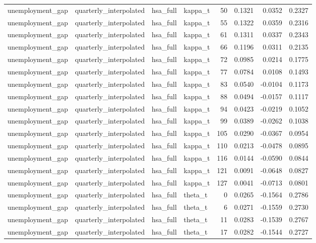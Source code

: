 \begin{tabular}{llllrrrr}
unemployment\_gap & quarterly\_interpolated & hsa\_full & kappa\_t & 50 & 0.1321 & 0.0352 & 0.2327 \\
unemployment\_gap & quarterly\_interpolated & hsa\_full & kappa\_t & 55 & 0.1322 & 0.0359 & 0.2316 \\
unemployment\_gap & quarterly\_interpolated & hsa\_full & kappa\_t & 61 & 0.1311 & 0.0337 & 0.2343 \\
unemployment\_gap & quarterly\_interpolated & hsa\_full & kappa\_t & 66 & 0.1196 & 0.0311 & 0.2135 \\
unemployment\_gap & quarterly\_interpolated & hsa\_full & kappa\_t & 72 & 0.0985 & 0.0214 & 0.1775 \\
unemployment\_gap & quarterly\_interpolated & hsa\_full & kappa\_t & 77 & 0.0784 & 0.0108 & 0.1493 \\
unemployment\_gap & quarterly\_interpolated & hsa\_full & kappa\_t & 83 & 0.0540 & -0.0104 & 0.1173 \\
unemployment\_gap & quarterly\_interpolated & hsa\_full & kappa\_t & 88 & 0.0494 & -0.0157 & 0.1117 \\
unemployment\_gap & quarterly\_interpolated & hsa\_full & kappa\_t & 94 & 0.0423 & -0.0219 & 0.1052 \\
unemployment\_gap & quarterly\_interpolated & hsa\_full & kappa\_t & 99 & 0.0389 & -0.0262 & 0.1038 \\
unemployment\_gap & quarterly\_interpolated & hsa\_full & kappa\_t & 105 & 0.0290 & -0.0367 & 0.0954 \\
unemployment\_gap & quarterly\_interpolated & hsa\_full & kappa\_t & 110 & 0.0213 & -0.0478 & 0.0895 \\
unemployment\_gap & quarterly\_interpolated & hsa\_full & kappa\_t & 116 & 0.0144 & -0.0590 & 0.0844 \\
unemployment\_gap & quarterly\_interpolated & hsa\_full & kappa\_t & 121 & 0.0091 & -0.0648 & 0.0827 \\
unemployment\_gap & quarterly\_interpolated & hsa\_full & kappa\_t & 127 & 0.0041 & -0.0713 & 0.0801 \\
unemployment\_gap & quarterly\_interpolated & hsa\_full & theta\_t & 0 & 0.0265 & -0.1564 & 0.2786 \\
unemployment\_gap & quarterly\_interpolated & hsa\_full & theta\_t & 6 & 0.0271 & -0.1559 & 0.2730 \\
unemployment\_gap & quarterly\_interpolated & hsa\_full & theta\_t & 11 & 0.0283 & -0.1539 & 0.2767 \\
unemployment\_gap & quarterly\_interpolated & hsa\_full & theta\_t & 17 & 0.0282 & -0.1544 & 0.2727 \\

\end{tabular}
